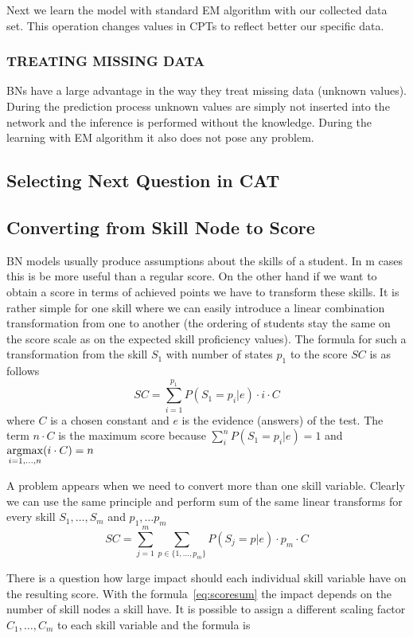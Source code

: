 Next we learn the model with standard EM algorithm with our collected data set. This operation changes values in CPTs to reflect better our specific data.

\subsubsection{TREATING MISSING DATA}
BNs have a large advantage in the way they treat missing data (unknown values). During the prediction process unknown values are simply not inserted into the network and the inference is performed without the knowledge. During the learning with EM algorithm it also does not pose any problem.

\subsection{Selecting Next Question in CAT}

\subsection{Converting from Skill Node to Score}
\label{sec:converting_skill}
BN models usually produce assumptions about the skills of a student. In m cases this is be more useful than a regular score. On the other hand if we want to obtain a score in terms of achieved points we have to transform these skills. It is rather simple for one skill where we can easily introduce a linear combination transformation from one to another (the ordering of students stay the same on the score scale as on the expected skill proficiency values). The formula for such a transformation from the skill $S_1$ with number of states $p_1$ to the score $SC$ is as follows
$$SC = \sum_{i=1}^{p_1}{P(S_1=p_i|e)\cdot i\cdot C} $$
where $C$ is a chosen constant and $e$ is the evidence (answers) of the test. The term $n\cdot C$ is the maximum score because $\sum_{i}^n{P(S_1=p_i|e)} = 1$ and $\underset{i=1,\ldots, n}{\operatorname*{\arg\!\max}} (i\cdot C) = n$

A problem appears when we need to convert more than one skill variable. Clearly we can use the same principle and perform sum of the same linear transforms for every skill $S_1,\ldots, S_m$ and $p_1,\ldots p_m$
\begin{equation}
SC = \sum_{j=1}^m{\sum_{p\in \{1,\ldots,p_m\}}{P(S_j=p|e)\cdot p_m\cdot C}} 
\label{eq:scoresum}
\end{equation}

There is a question how large impact should each individual skill variable have on the resulting score. With the formula~\ref{eq:scoresum} the impact depends on the number of skill nodes a skill have. It is possible to assign a different scaling factor $C_1,\ldots, C_m$ to each skill variable and the formula is

